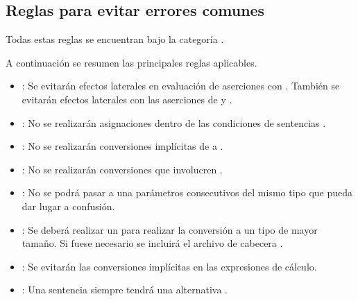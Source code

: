 \subsection{Reglas para evitar errores comunes}

Todas estas reglas se encuentran bajo la categoría .

A continuación se resumen las principales reglas aplicables.

\begin{itemize}

\item {}:
Se evitarán efectos laterales en evaluación de aserciones con .
También se evitarán efectos laterales con las aserciones de  
 y .

\item {}:
No se realizarán asignaciones dentro de las condiciones de sentencias .

\item {}:
No se realizarán conversiones implícitas de  a .

\item {}:
No se realizarán conversiones que involucren .

\item {}: 
No se podrá pasar a una parámetros consecutivos del mismo tipo
que pueda dar lugar a confusión.

\item {}: 
Se deberá
realizar un  para realizar la conversión a un tipo
de mayor tamaño. Si fuese necesario se incluirá el archivo de cabecera 
.

\item {}: 
Se evitarán las conversiones implícitas en las expresiones de cálculo.

\item {}:
Una sentencia  siempre tendrá una alternativa .

\end{itemize}
